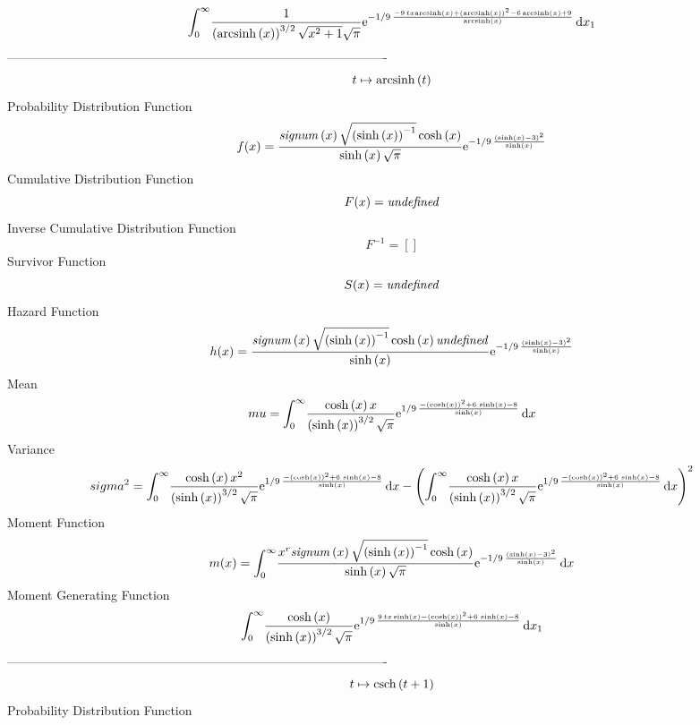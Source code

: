 \documentclass[12pt]{article}
\begin{document}
 $$\int_{0}^{\infty }\!{\frac {1}{ \left( {\rm arcsinh} \left(x\right)
 \right) ^{3/2}\sqrt {{x}^{2}+1}\sqrt {\pi}}{{\rm e}^{-1/9\,{\frac {-9
\,tx{\rm arcsinh} \left(x\right)+ \left( {\rm arcsinh} \left(x\right)
 \right) ^{2}-6\,{\rm arcsinh} \left(x\right)+9}{{\rm arcsinh} \left(x
\right)}}}}}\,{\rm d}x_{{1}}
$$-------------------------------------------------------------------------------------------  \\$$t\mapsto {\rm arcsinh} \left(t\right)
$$Probability Distribution Function 
$$  f(x)={\frac {{\it signum} \left( x \right) \sqrt { \left( \sinh \left( x
 \right)  \right) ^{-1}}\cosh \left( x \right) }{\sinh \left( x
 \right) \sqrt {\pi}}{{\rm e}^{-1/9\,{\frac { \left( \sinh \left( x
 \right) -3 \right) ^{2}}{\sinh \left( x \right) }}}}}
$$Cumulative Distribution Function  
 $$F(x)={\it undefined}
$$ Inverse Cumulative Distribution Function 
  $$F^{-1} = []
$$Survivor Function 
 $$ S(x)={\it undefined}
$$ Hazard Function 
 $$ h(x)={\frac {{\it signum} \left( x \right) \sqrt { \left( \sinh \left( x
 \right)  \right) ^{-1}}\cosh \left( x \right) {\it undefined}}{\sinh
 \left( x \right) }{{\rm e}^{-1/9\,{\frac { \left( \sinh \left( x
 \right) -3 \right) ^{2}}{\sinh \left( x \right) }}}}}
$$Mean 
 $$ mu=\int_{0}^{\infty }\!{\frac {\cosh \left( x \right) x}{ \left( \sinh
 \left( x \right)  \right) ^{3/2}\sqrt {\pi}}{{\rm e}^{1/9\,{\frac {-
 \left( \cosh \left( x \right)  \right) ^{2}+6\,\sinh \left( x
 \right) -8}{\sinh \left( x \right) }}}}}\,{\rm d}x
$$ Variance 
 $$ sigma^2 = \int_{0}^{\infty }\!{\frac {\cosh \left( x \right) {x}^{2}}{ \left( 
\sinh \left( x \right)  \right) ^{3/2}\sqrt {\pi}}{{\rm e}^{1/9\,{
\frac {- \left( \cosh \left( x \right)  \right) ^{2}+6\,\sinh \left( x
 \right) -8}{\sinh \left( x \right) }}}}}\,{\rm d}x- \left( \int_{0}^{
\infty }\!{\frac {\cosh \left( x \right) x}{ \left( \sinh \left( x
 \right)  \right) ^{3/2}\sqrt {\pi}}{{\rm e}^{1/9\,{\frac {- \left( 
\cosh \left( x \right)  \right) ^{2}+6\,\sinh \left( x \right) -8}{
\sinh \left( x \right) }}}}}\,{\rm d}x \right) ^{2}
$$Moment Function 
 $$ m(x) = \int_{0}^{\infty }\!{\frac {{x}^{r}{\it signum} \left( x \right) 
\sqrt { \left( \sinh \left( x \right)  \right) ^{-1}}\cosh \left( x
 \right) }{\sinh \left( x \right) \sqrt {\pi}}{{\rm e}^{-1/9\,{\frac {
 \left( \sinh \left( x \right) -3 \right) ^{2}}{\sinh \left( x
 \right) }}}}}\,{\rm d}x
$$ Moment Generating Function 
 $$\int_{0}^{\infty }\!{\frac {\cosh \left( x \right) }{ \left( \sinh
 \left( x \right)  \right) ^{3/2}\sqrt {\pi}}{{\rm e}^{1/9\,{\frac {9
\,tx\sinh \left( x \right) - \left( \cosh \left( x \right)  \right) ^{
2}+6\,\sinh \left( x \right) -8}{\sinh \left( x \right) }}}}}\,{\rm d}
x_{{1}}
$$-------------------------------------------------------------------------------------------  \\$$t\mapsto {\rm csch} \left(t+1\right)
$$Probability Distribution Function 
\end{document}
